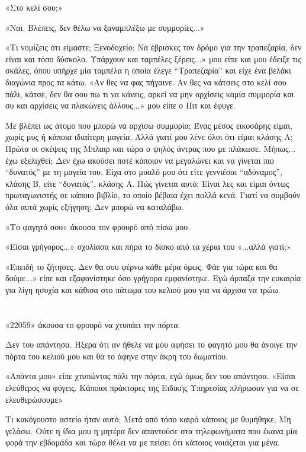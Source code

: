 \documentclass[12pt,twoside, openany]{book}
\begin{document}
«Στο κελί σου;»

«Ναι. Βλέπεις, δεν θέλω να ξαναμπλέξω με συμμορίες...»

«Τι νομίζεις ότι είμαστε; Ξενοδοχείο; Να έβρισκες τον δρόμο για την τραπεζαρία, δεν είναι και τόσο δύσκολο. Υπάρχουν και ταμπέλες ξέρεις...» μου είπε και μου έδειξε τις σκάλες, όπου υπήρχε μία ταμπέλα η οποία έλεγε “Τραπεζαρία” και είχε ένα βελάκι διαγώνια προς τα κάτω. «Αν θες να φας πήγαινε. Αν θες να κάτσεις στο κελί σου πάλι, κάτσε, δεν θα σου πω τι να κάνεις, αρκεί να μην αρχίσεις καμία συμμορία και συ και αρχίσεις να πλακώνεις άλλους...» μου είπε ο Πιτ και έφυγε.

Με βλέπει ως άτομο που μπορώ να αρχίσω συμμορία; Ένας μέσος εικοσάρης είμαι, χωρίς μυς ή κάποια ιδιαίτερη μαγεία. Αλλά γιατί μου λένε όλοι ότι είμαι κλάσης Α; Πρώτα οι σκέψεις της Μπλαιρ και τώρα ο ψηλός άντρας που με πλάκωσε. Μήπως... έχω εξελιχθεί; Δεν έχω ακούσει ποτέ κάποιον να μεγαλώνει και να γίνεται πιο “δυνατός” με τη μαγεία του. Είχα στο μυαλό μου ότι είτε γεννιέσαι “αδύναμος”, κλάσης Β, είτε “δυνατός”, κλάσης Α. Πώς γίνεται αυτό; Είναι λες και είμαι όντως πρωταγωνιστής σε κάποιο βιβλίο, το οποίο βέβαια έχει πολλά κενά. Γιατί να συμβούν όλα αυτά χωρίς εξήγηση; Δεν μπορώ να καταλάβω.

«Το φαγητό σου» άκουσα τον φρουρό από πίσω μου.

«Είσαι γρήγορος...» σχολίασα και πήρα το δίσκο από τα χέρια του «...αλλά γιατί;»

«Επειδή το ζήτησες. Δεν θα σου φέρνω κάθε μέρα όμως. Φάε για τώρα και θα δούμε...» είπε και εξαφανίστηκε όσο γρήγορα εμφανίστηκε. Εγώ άρπαξα την ευκαιρία για λίγη ησυχία και κάθισα στο πάτωμα του κελιού μου για να άρχισα να τρώω.

\chapter{}

«22059» άκουσα το φρουρό να χτυπάει την πόρτα.

Δεν του απάντησα. Ήξερα ότι αν ήθελε να μου αφήσει το φαγητό μου θα άνοιγε την πόρτα του κελιού μου και θα το άφηνε στην άκρη του δωματίου.

«Απάντα μου» είπε χτυπώντας πάλι την πόρτα, εγώ όμως δεν του απάντησα. «Είσαι ελεύθερος να φύγεις. Κάποιοι πράκτορες της Ειδικής Υπηρεσίας πλήρωσαν για να σε ελευθερώσουμε»

Τι κακόγουστο αστείο ήταν αυτό; Μετά από τόσο καιρό κάποιος με θυμήθηκε; Μη γελάσω. Ούτε η ίδια μου η μητέρα δεν απαντούσε στα τηλεφωνήματα που έκανα μία φορά την εβδομάδα και τώρα θέλει να με πείσει ότι κάποιος νοιάζεται για μένα.
\end{document}
